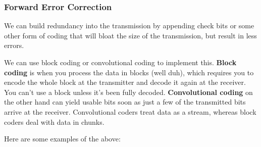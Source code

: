 \subsubsection{Forward Error Correction}

We can build redundancy into the transmission by appending check bits or some
other form of coding that will bloat the size of the transmission, but result in
less errors.

We can use block coding or convolutional coding to implement this. \textbf{Block
coding} is when you process the data in blocks (well duh), which requires you to
encode the whole block at the transmitter and decode it again at the receiver.
You can't use a block unless it's been fully decoded. \textbf{Convolutional
coding} on the other hand can yield usable bits soon as just a few of the
transmitted bits arrive at the receiver. Convolutional coders treat data as a
stream, whereas block coders deal with data in chunks.

Here are some examples of the above:

